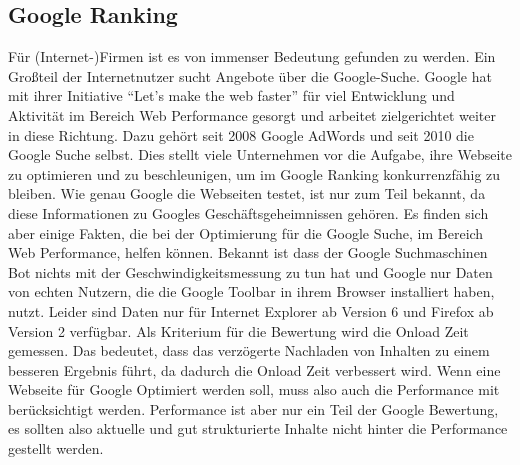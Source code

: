 \subsection{Google Ranking}
Für (Internet-)Firmen ist es von immenser Bedeutung gefunden zu werden. Ein Großteil der Internetnutzer sucht Angebote über die Google-Suche. Google hat mit ihrer Initiative ``Let's make the web faster'' für viel Entwicklung und Aktivität im Bereich Web Performance gesorgt und arbeitet zielgerichtet weiter in diese Richtung. Dazu gehört seit  2008 Google AdWords und seit 2010 die Google Suche selbst. Dies stellt viele Unternehmen vor die Aufgabe, ihre Webseite zu optimieren und zu beschleunigen, um im Google Ranking konkurrenzfähig zu bleiben. Wie genau Google die Webseiten testet, ist nur zum Teil bekannt, da diese Informationen zu Googles Geschäftsgeheimnissen gehören. Es finden sich aber einige Fakten, die bei der Optimierung für die Google Suche, im Bereich Web Performance, helfen können.
Bekannt ist dass der Google Suchmaschinen Bot nichts mit der Geschwindigkeitsmessung zu tun hat und Google nur Daten von echten Nutzern, die die Google Toolbar in ihrem Browser installiert haben, nutzt. Leider sind Daten nur für Internet Explorer ab Version 6 und Firefox ab Version 2 verfügbar. Als Kriterium für die Bewertung wird die Onload Zeit gemessen. Das bedeutet, dass das verzögerte Nachladen von Inhalten zu einem besseren Ergebnis führt, da dadurch die Onload Zeit verbessert wird. Wenn eine Webseite für Google Optimiert werden soll, muss also auch die Performance mit berücksichtigt werden. Performance ist aber nur ein Teil der Google Bewertung, es sollten also aktuelle und gut strukturierte Inhalte nicht hinter die Performance gestellt werden.


